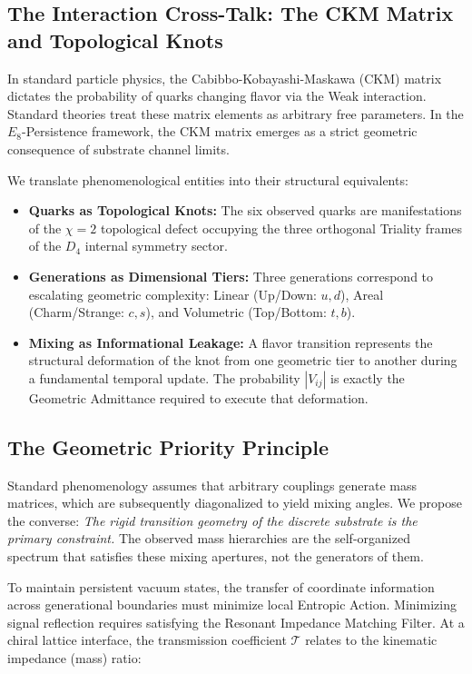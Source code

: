 \subsection{The Interaction Cross-Talk: The CKM Matrix and Topological Knots}

In standard particle physics, the Cabibbo-Kobayashi-Maskawa (CKM) matrix dictates the probability of quarks changing flavor via the Weak interaction. Standard theories treat these matrix elements as arbitrary free parameters. In the $E_8$-Persistence framework, the CKM matrix emerges as a strict geometric consequence of substrate channel limits.

We translate phenomenological entities into their structural equivalents:
\begin{itemize}
    \item \textbf{Quarks as Topological Knots:} The six observed quarks are manifestations of the $\chi=2$ topological defect occupying the three orthogonal Triality frames of the $D_4$ internal symmetry sector.
    \item \textbf{Generations as Dimensional Tiers:} Three generations correspond to escalating geometric complexity: Linear (Up/Down: $u,d$), Areal (Charm/Strange: $c,s$), and Volumetric (Top/Bottom: $t,b$).
    \item \textbf{Mixing as Informational Leakage:} A flavor transition represents the structural deformation of the knot from one geometric tier to another during a fundamental temporal update. The probability $|V_{ij}|$ is exactly the Geometric Admittance required to execute that deformation.
\end{itemize}

\subsection{The Geometric Priority Principle}

Standard phenomenology assumes that arbitrary couplings generate mass matrices, which are subsequently diagonalized to yield mixing angles. We propose the converse: \textit{The rigid transition geometry of the discrete substrate is the primary constraint.} The observed mass hierarchies are the self-organized spectrum that satisfies these mixing apertures, not the generators of them.

To maintain persistent vacuum states, the transfer of coordinate information across generational boundaries must minimize local Entropic Action. Minimizing signal reflection requires satisfying the Resonant Impedance Matching Filter. At a chiral lattice interface, the transmission coefficient $\mathcal{T}$ relates to the kinematic impedance (mass) ratio:

